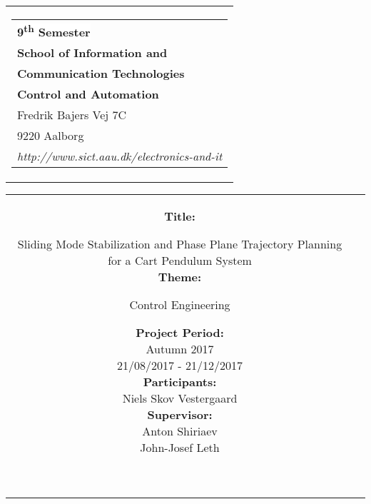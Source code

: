 % 
\thispagestyle{empty}
\begin{titlepage}
\begin{nopagebreak}
{\samepage 

\begin{tabular}{r}
\hspace{-.6cm} \parbox{\textwidth}{  
\hspace{1.25cm} \parbox{8cm}{\begin{tabular}{l} %
{\small \textbf{\textcolor{aaublue}{\colorbox{white}{9\textsuperscript{th} Semester}}}}\\
{\small \textbf{\textcolor{aaublue}{School of Information and}}}\\
{\small \textbf{\textcolor{aaublue}{Communication Technologies}}}\\ 
{\small \textbf{\textcolor{aaublue}{Control and Automation}}}\\
{\small \textcolor{aaublue}{Fredrik Bajers Vej 7C}} \\
{\small \textcolor{aaublue}{9220 Aalborg}} \\
{\small \textcolor{aaublue}{\emph{http://www.sict.aau.dk/electronics-and-it}}}
\end{tabular}}}
\end{tabular}

\begin{tabular}{cc}
\parbox{7cm}{

\textbf{Title:}

Sliding Mode Stabilization and Phase Plane Trajectory Planning for a Cart Pendulum System\\

\textbf{Theme:}

\small{
Control Engineering\\
}


\parbox{8cm}{


\textbf{Project Period:}\\
Autumn 2017\\
21/08/2017 - 21/12/2017\\

\textbf{Participants:}\\
Niels Skov Vestergaard\\

\textbf{Supervisor:}\\
Anton Shiriaev\\
John-Josef Leth\\
}\\

}
\end{tabular}}
\end{nopagebreak}
\end{titlepage}
